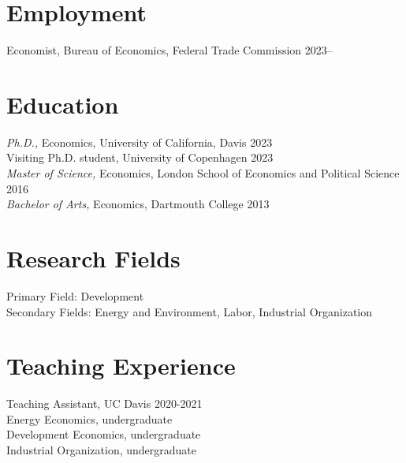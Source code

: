 \documentclass[10pt]{res} %
\begin{document}
	\begin{resume}
		
		\section{Employment}
		Economist, Bureau of Economics, Federal Trade Commission  \hfill 2023-- 
		\section{Education}
		{\sl Ph.D.,} Economics, University of California, Davis  \hfill 2023 \\
		\hspace*{6mm} Visiting Ph.D. student, University of Copenhagen \hfill 2023 \\
		{\sl Master of Science,} Economics, London School of Economics and Political Science \hfill 2016 \\
		{\sl Bachelor of Arts,} Economics, Dartmouth College \hfill 2013
		
		
		\section{Research Fields}
		Primary Field: Development\\
		Secondary Fields: Energy and Environment, Labor, Industrial Organization
		\section{Teaching Experience} 
		Teaching Assistant, UC Davis  \hfill 2020-2021 \\
		\hspace*{6mm} Energy Economics, undergraduate \\
		\hspace*{6mm} Development Economics, undergraduate \\
		\hspace*{6mm} Industrial Organization, undergraduate  
		

\end{resume}
\end{document}
